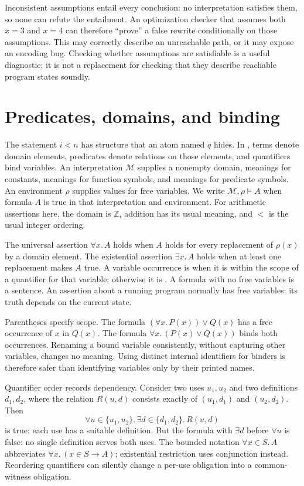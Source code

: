 Inconsistent assumptions entail every conclusion: no interpretation satisfies them, so none can refute the entailment.
An optimization checker that assumes both $x=3$ and $x=4$ can therefore \enquote{prove} a false rewrite conditionally on those assumptions.
This may correctly describe an unreachable path, or it may expose an encoding bug.
Checking whether assumptions are satisfiable is a useful diagnostic; it is not a replacement for checking that they describe reachable program states soundly.

\section{Predicates, domains, and binding}
\label{sec:ch40-quantifiers}

The statement $i<n$ has structure that an atom named $q$ hides.
In , terms denote domain elements, predicates denote relations on those elements, and quantifiers bind variables.
An interpretation $\mathcal M$ supplies a nonempty domain, meanings for constants, meanings for function symbols, and meanings for predicate symbols.
An environment $\rho$ supplies values for free variables.
We write $\mathcal M,\rho\models A$ when formula $A$ is true in that interpretation and environment.
For arithmetic assertions here, the domain is $\mathbb Z$, addition has its usual meaning, and $<$ is the usual integer ordering.

The universal assertion $\forall x.\,A$ holds when $A$ holds for every replacement of $\rho(x)$ by a domain element.
The existential assertion $\exists x.\,A$ holds when at least one replacement makes $A$ true.
A variable occurrence is  when it is within the scope of a quantifier for that variable; otherwise it is .
A formula with no free variables is a sentence.
An assertion about a running program normally has free variables: its truth depends on the current state.

Parentheses specify scope.
The formula $(\forall x.\,P(x))\lor Q(x)$ has a free occurrence of $x$ in $Q(x)$.
The formula $\forall x.\,(P(x)\lor Q(x))$ binds both occurrences.
Renaming a bound variable consistently, without capturing other variables, changes no meaning.
Using distinct internal identifiers for binders is therefore safer than identifying variables only by their printed names.

Quantifier order records dependency.
Consider two uses $u_1,u_2$ and two definitions $d_1,d_2$, where the relation $R(u,d)$ consists exactly of $(u_1,d_1)$ and $(u_2,d_2)$.
Then
\[
 \forall u\in\{u_1,u_2\}.\,\exists d\in\{d_1,d_2\}.\,R(u,d)
\]
is true: each use has a suitable definition.
But the formula with $\exists d$ before $\forall u$ is false: no single definition serves both uses.
The bounded notation $\forall x\in S.\,A$ abbreviates $\forall x.\,(x\in S\rightarrow A)$; existential restriction uses conjunction instead.
Reordering quantifiers can silently change a per-use obligation into a common-witness obligation.

